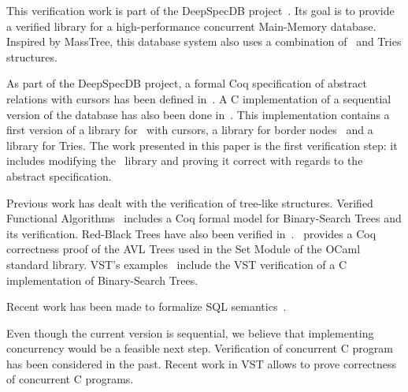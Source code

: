 This verification work is part of the DeepSpecDB project~\cite{deepdb}.
Its goal is to provide a verified library for a high-performance concurrent Main-Memory database.
Inspired by MassTree, this database system also uses a combination of \btrees\ and Tries structures.

As part of the DeepSpecDB project, a formal Coq specification of abstract relations with cursors has been defined in~\cite{brian}.
A C implementation of a sequential version of the database has also been done in~\cite{tosin}.
This implementation contains a first version of a library for \btrees\ with cursors, a library for border nodes~\cite{masstree} and a library for Tries.
The work presented in this paper is the first verification step: it includes modifying the \btrees\ library and proving it correct with regards to the abstract specification.

Previous work has dealt with the verification of tree-like structures.
Verified Functional Algorithms~\cite{vfa} includes a Coq formal model for Binary-Search Trees and its verification.
Red-Black Trees have also been verified in~\cite{redblack}. \cite{functors}~provides a Coq correctness proof of the AVL Trees used in the Set Module of the OCaml standard library.
VST's examples~\cite{vst} include the VST verification of a C implementation of Binary-Search Trees.

Recent work has been made to formalize SQL semantics~\cite{coqsql}.

Even though the current version is sequential, we believe that implementing concurrency would be a feasible next step.
Verification of concurrent C program has been considered in the past.
Recent work in VST allows to prove correctness of concurrent C programs.


